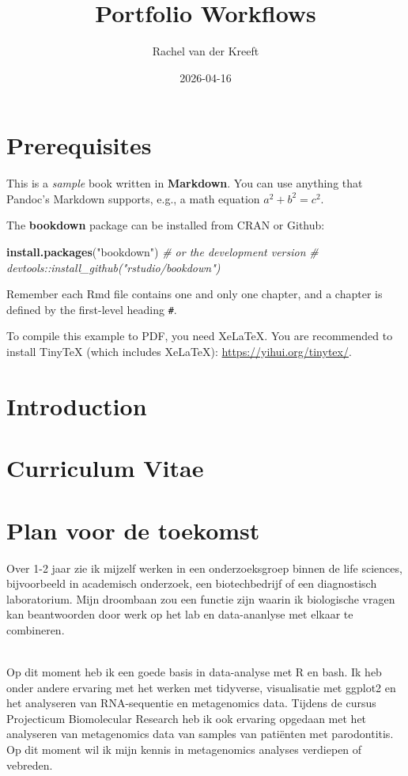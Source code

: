 \documentclass[
]{book}
\title{Portfolio Workflows}
\author{Rachel van der Kreeft}
\date{2026-04-16}
\newenvironment{Shaded}{\begin{snugshade}}{\end{snugshade}}
\newcommand{\CommentTok}[1]{\textcolor[rgb]{0.56,0.35,0.01}{\textit{#1}}}
\newcommand{\FunctionTok}[1]{\textcolor[rgb]{0.13,0.29,0.53}{\textbf{#1}}}
\newcommand{\NormalTok}[1]{#1}
\newcommand{\StringTok}[1]{\textcolor[rgb]{0.31,0.60,0.02}{#1}}
\begin{document}
\maketitle

{
\setcounter{tocdepth}{1}
\tableofcontents
}
\chapter{Prerequisites}\label{prerequisites}

This is a \emph{sample} book written in \textbf{Markdown}. You can use anything that Pandoc's Markdown supports, e.g., a math equation \(a^2 + b^2 = c^2\).

The \textbf{bookdown} package can be installed from CRAN or Github:

\begin{Shaded}
\begin{Highlighting}[]
\FunctionTok{install.packages}\NormalTok{(}\StringTok{"bookdown"}\NormalTok{)}
\CommentTok{\# or the development version}
\CommentTok{\# devtools::install\_github("rstudio/bookdown")}
\end{Highlighting}
\end{Shaded}

Remember each Rmd file contains one and only one chapter, and a chapter is defined by the first-level heading \texttt{\#}.

To compile this example to PDF, you need XeLaTeX. You are recommended to install TinyTeX (which includes XeLaTeX): \url{https://yihui.org/tinytex/}.

\chapter{Introduction}\label{introduction}

\chapter{Curriculum Vitae}\label{curriculum-vitae}

\chapter{Plan voor de toekomst}\label{plan-voor-de-toekomst}

Over 1-2 jaar zie ik mijzelf werken in een onderzoeksgroep binnen de life sciences, bijvoorbeeld in academisch onderzoek, een biotechbedrijf of een diagnostisch laboratorium. Mijn droombaan zou een functie zijn waarin ik biologische vragen kan beantwoorden door werk op het lab en data-ananlyse met elkaar te combineren.\\
\strut \\
Op dit moment heb ik een goede basis in data-analyse met R en bash. Ik heb onder andere ervaring met het werken met tidyverse, visualisatie met ggplot2 en het analyseren van RNA-sequentie en metagenomics data. Tijdens de cursus Projecticum Biomolecular Research heb ik ook ervaring opgedaan met het analyseren van metagenomics data van samples van patiënten met parodontitis. Op dit moment wil ik mijn kennis in metagenomics analyses verdiepen of vebreden.
\end{document}
